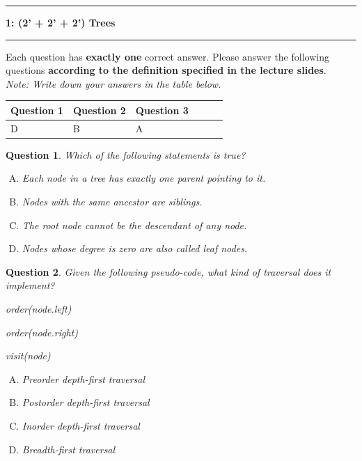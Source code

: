 \documentclass{article}
\newcommand\question[2]{\vspace{.25in}\hrule\textbf{#1: #2}\vspace{.5em}\hrule\vspace{.10in}}
\newtheorem{Q}{Question}
\begin{document}
\question{1}{(2' + 2' + 2') Trees}
Each question has \textbf{exactly one} correct answer. Please answer the following questions \textbf{according to  the definition specified in the lecture slides}.\\

\textit{Note: Write down your answers in the table below. }
\begin{table}[htbp]
	\begin{tabular}{|p{2cm}|p{2cm}|p{2cm}|p{2cm}|p{2cm}|p{2cm}|}
		\hline
		Question 1 & Question 2 & Question 3 \\
		\hline
		D          & B          & A          \\
		\hline
	\end{tabular}
\end{table}

\begin{Q}
	Which of the following statements is true?
	\begin{enumerate}[(A)]
		\item Each node in a tree has exactly one parent pointing to it.
		\item Nodes with the same ancestor are siblings.
		\item The root node cannot be the descendant of any node.
		\item Nodes whose degree is zero are also called leaf nodes.
	\end{enumerate}
\end{Q}
\vspace{0.5cm}


\begin{Q} Given the following pseudo-code, what kind of traversal does it implement?

	\begin{algorithm}[H]
		\begin{algorithmic}[1]
			\State order(node.left)
			\EndIf

			\State order(node.right)
			\EndIf

			\State visit(node)
			\EndFunction
		\end{algorithmic}
	\end{algorithm}


	\begin{enumerate}[(A)]
		\item Preorder depth-first traversal
		\item Postorder depth-first traversal
		\item Inorder depth-first traversal
		\item Breadth-first traversal
	\end{enumerate}
\end{Q}
\end{document}
